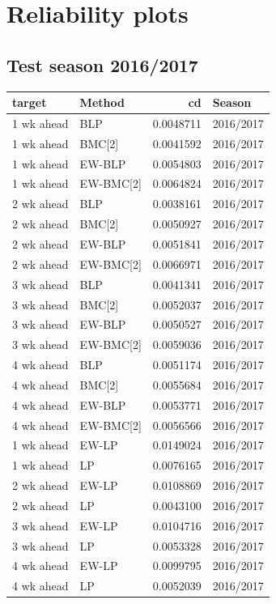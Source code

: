 \documentclass[
]{article}
\begin{document}
\hypertarget{reliability-plots}{%
\section{Reliability plots}\label{reliability-plots}}

\hypertarget{test-season-20162017}{%
\subsection{Test season 2016/2017}\label{test-season-20162017}}

\begin{tabular}{l|l|r|l}
\hline
target & Method & cd & Season\\
\hline
1 wk ahead & BLP & 0.0048711 & 2016/2017\\
\hline
1 wk ahead & BMC[2] & 0.0041592 & 2016/2017\\
\hline
1 wk ahead & EW-BLP & 0.0054803 & 2016/2017\\
\hline
1 wk ahead & EW-BMC[2] & 0.0064824 & 2016/2017\\
\hline
2 wk ahead & BLP & 0.0038161 & 2016/2017\\
\hline
2 wk ahead & BMC[2] & 0.0050927 & 2016/2017\\
\hline
2 wk ahead & EW-BLP & 0.0051841 & 2016/2017\\
\hline
2 wk ahead & EW-BMC[2] & 0.0066971 & 2016/2017\\
\hline
3 wk ahead & BLP & 0.0041341 & 2016/2017\\
\hline
3 wk ahead & BMC[2] & 0.0052037 & 2016/2017\\
\hline
3 wk ahead & EW-BLP & 0.0050527 & 2016/2017\\
\hline
3 wk ahead & EW-BMC[2] & 0.0059036 & 2016/2017\\
\hline
4 wk ahead & BLP & 0.0051174 & 2016/2017\\
\hline
4 wk ahead & BMC[2] & 0.0055684 & 2016/2017\\
\hline
4 wk ahead & EW-BLP & 0.0053771 & 2016/2017\\
\hline
4 wk ahead & EW-BMC[2] & 0.0056566 & 2016/2017\\
\hline
1 wk ahead & EW-LP & 0.0149024 & 2016/2017\\
\hline
1 wk ahead & LP & 0.0076165 & 2016/2017\\
\hline
2 wk ahead & EW-LP & 0.0108869 & 2016/2017\\
\hline
2 wk ahead & LP & 0.0043100 & 2016/2017\\
\hline
3 wk ahead & EW-LP & 0.0104716 & 2016/2017\\
\hline
3 wk ahead & LP & 0.0053328 & 2016/2017\\
\hline
4 wk ahead & EW-LP & 0.0099795 & 2016/2017\\
\hline
4 wk ahead & LP & 0.0052039 & 2016/2017\\
\hline
\end{tabular}
\end{document}
